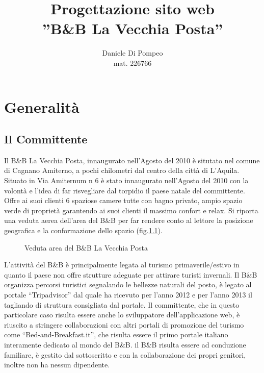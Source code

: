 \documentclass[a4paper,12pt,hidelinks]{report}
\title{Progettazione sito web\\ ''B\&B La Vecchia Posta''}
\author{Daniele Di Pompeo \\mat. 226766}
\begin{document}

\maketitle


\chapter{Generalità}
\section{Il Committente}
Il B\&B La Vecchia Posta, innaugurato nell'Agosto del 2010 è situtato nel comune di Cagnano Amiterno, a pochi chilometri dal centro della città di L'Aquila. Situato in Via Amiternum n 6 è
stato innaugurato nell'Agosto del 2010 con la volontà e l'idea di far risvegliare dal torpidio il paese natale del committente.
Offre ai suoi clienti 6 spaziose camere tutte con bagno privato, ampio spazio verde di proprietà garantendo ai suoi clienti il massimo confort e relax. 
Si riporta una veduta aerea dell'area del B\&B per far rendere conto al lettore la posizione geografica e la conformazione dello spazio (fig.\ref{fig:bbArea}). 

\begin{figure}[h!]%
	\centering
	\caption{Veduta area del B\&B La Vecchia Posta}%
	\label{fig:bbArea}%
\end{figure}
L'attività del B\&B è principalmente legata al turismo primaverile/estivo in quanto il paese non offre strutture adeguate per attirare turisti invernali.
Il B\&B organizza percorsi turistici segnalando le bellezze naturali del posto, è legato al portale ``Tripadvisor'' dal quale ha ricevuto per l'anno 2012 e per l'anno 2013 il tagliando di struttura consigliata dal portale.
Il committente, che in questo particolare caso risulta essere anche lo sviluppatore dell'applicazione web, è riuscito a stringere collaborazioni con altri portali di promozione del turismo come ``Bed-and-Breakfast.it'', che risulta essere
il primo portale italiano interamente dedicato al mondo del B\&B. il B\&B risulta essere ad conduzione familiare, è gestito dal sottoscritto e con la collaborazione dei propri genitori, inoltre non ha nessun dipendente.
\end{document}
